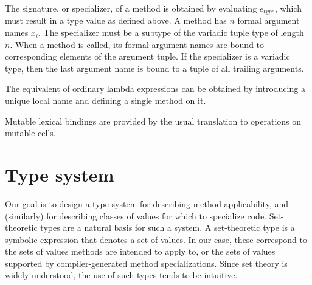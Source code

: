 The signature, or specializer, of a method is obtained by evaluating $e_{type}$,
which must result in a type value as defined above. A method has $n$
formal argument names $x_i$. The specializer must be a subtype of the
variadic tuple type of length $n$. When a method is called, its formal argument
names are bound to corresponding elements of the argument tuple. If the
specializer is a variadic type, then the last argument name is bound to a
tuple of all trailing arguments.


The equivalent of ordinary lambda expressions can be obtained by introducing
a unique local name and defining a single method on it.

Mutable lexical bindings are provided by the usual translation to operations
on mutable cells.





\section{Type system}
\label{sec:typesystem}

Our goal is to design a type system for describing method applicability,
and (similarly) for describing classes of values for which to specialize code.
Set-theoretic types are a natural basis for such a system.
A set-theoretic type is a symbolic expression that denotes a set of values.
In our case, these correspond to the sets of values methods are intended to apply
to, or the sets of values supported by compiler-generated method specializations.
Since set theory is widely understood, the use of such types tends to be intuitive.

